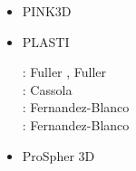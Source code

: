 \begin{itemize}
\begin{scriptsize}
\begin{itemize}
                             \textcite{tigv09},  \textcite{yamb09}
\item[\twothousandten]       \textcite{bucl10}
\item[\twothousandtwelve]    \textcite{anwb12},  \textcite{gech12}, \textcite{talv12},
                             \textcite{gubc12},  \textcite{gerb12}, 
\item[\twothousandthirteen]  \textcite{wabd13},  \textcite{frbm13}, \textcite{tibb13}
\item[\twothousandfourteen]  \textcite{frba14},  \textcite{gagb14}, 
                             \textcite{bufa14},  \textcite{bufy14b}
\item[\twothousandfifteen]   \textcite{wulc15},  \textcite{gebw15}, \textcite{svlh15}
\item[\twothousandsixteen]   \textcite{marl16},  \textcite{jala16}
\item[\twothousandeighteen]  \textcite{gesr18}
\item[\twothousandnineteen]  \textcite{jala19}
\end{itemize}
\end{scriptsize}

\item PINK3D

{\small
\noindent
\textcite{vosc15}
}


\item PLASTI

\begin{scriptsize}
\twothousandsix: Fuller \etal \cite{fuwb06}, Fuller \etal \cite{fuwf06}\\
\twothousandthirteen: Cassola \cite{cass13}\\
\twothousandtwenty: Fernandez-Blanco \etal \cite{femb20}\\
\twothousandtwentyone: Fernandez-Blanco \etal \cite{femc21}
\end{scriptsize}

\item ProSpher 3D


\end{itemize}
